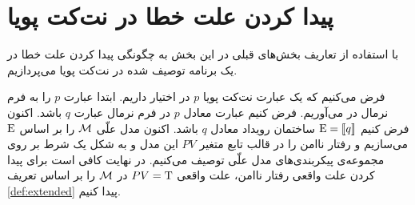 \section{پیدا کردن علت خطا در نت‌کت پویا}

با استفاده از تعاریف بخش‌های قبلی در این بخش به چگونگی پیدا کردن علت خطا در یک برنامه توصیف شده در نت‌کت پویا می‌پردازیم.

فرض می‌کنیم که یک عبارت نت‌کت پویا
$p$
در اختیار داریم.
ابتدا عبارت
$p$
را به فرم نرمال در می‌آوریم.
فرض کنیم عبارت معادل 
$p$
در فرم نرمال
عبارت 
$q$
باشد.
اکنون فرض کنیم 
$\mathrm{E} = \llbracket q \rrbracket$
ساختمان رویداد معادل 
$q$
باشد.
اکنون مدل علّی 
$\mathcal{M}$
را بر اساس
$\mathrm{E}$
می‌سازیم و رفتار ناامن را در قالب تابع متغیر
$PV$
این مدل و به شکل یک شرط بر روی مجموعه‌ی پیکربندی‌های مدل علّی توصیف می‌کنیم.
در نهایت کافی است برای پیدا کردن علت واقعی رفتار ناامن، علت واقعی 
$PV = \mathrm{T}$
در 
$\mathcal{M}$
را بر اساس تعریف 
\ref{def:extended}
پیدا کنیم.
